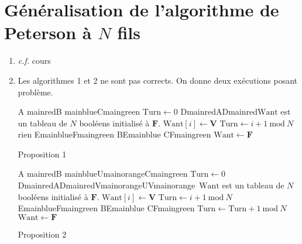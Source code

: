 \section{Généralisation de l'algorithme de Peterson à $N$ fils}

\begin{enumerate}
	\item \textit{c.f.} cours
	\item Les algorithmes 1 et 2 ne sont pas corrects. On donne deux exécutions posant problème.
		\begin{algorithm}[H]
			\centering
			\begin{algorithmic}[1]
				\State\Mark A {mainred}\quad\Mark B {mainblue}\quad\Mark C{maingreen} $\mathrm{Turn} \gets 0$
				\State\Mark D{mainred}\ConnectStates AD{mainred}\quad\quad$\mathrm{Want}$ est un tableau de $N$ booléens initialisé à $\mathbf{F}$.
				\State $\mathrm{Want}[i] \gets \mathbf{V}$
				\State $\mathrm{Turn} \gets i + 1\ \mathrm{mod}\ N$
				\State rien
				\EndWhile
				\State\Mark E{mainblue}\quad\Mark F{maingreen}
				\ConnectStates BE{mainblue}
				\ConnectStates CF{maingreen}
				\EndProcedure
				\State $\mathrm{Want} \gets \mathbf{F}$\/
				\EndProcedure
			\end{algorithmic}
			\caption{Proposition 1}
		\end{algorithm}
		\begin{algorithm}[H]
			\centering
			\begin{algorithmic}[1]
				\State\Mark A {mainred}\quad\Mark B {mainblue}\quad\Mark U{mainorange}\quad\Mark C{maingreen} $\mathrm{Turn} \gets 0$
				\State\Mark D{mainred}\ConnectStates AD{mainred}\quad\:\:\Mark V{mainorange}\ConnectStates[] UV{mainorange}\ \;$\mathrm{Want}$ est un tableau de $N$ booléens initialisé à $\mathbf{F}$.
				\State $\mathrm{Want}[i] \gets \mathbf{V}$
				\State $\mathrm{Turn} \gets i + 1\ \mathrm{mod}\ N$
				\State
				\State\Mark E{mainblue}\quad\Mark F{maingreen}
				\ConnectStates BE{mainblue}
				\ConnectStates CF{maingreen}
				$\mathrm{Turn} \gets \mathrm{Turn} + 1\ \mathrm{mod}\ N$
				\EndIf
				\EndWhile
				\EndProcedure
				\State $\mathrm{Want} \gets \mathbf{F}$\/
				\EndProcedure
			\end{algorithmic}
			\caption{Proposition 2}
		\end{algorithm}
\end{enumerate}
